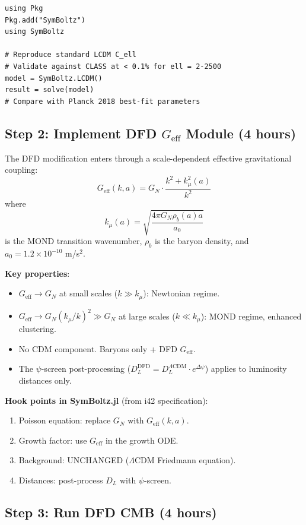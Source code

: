 \documentclass[11pt,a4paper]{article}
\begin{document}
\begin{verbatim}
using Pkg
Pkg.add("SymBoltz")
using SymBoltz

# Reproduce standard LCDM C_ell
# Validate against CLASS at < 0.1% for ell = 2-2500
model = SymBoltz.LCDM()
result = solve(model)
# Compare with Planck 2018 best-fit parameters
\end{verbatim}

\subsection{Step 2: Implement DFD $G_\text{eff}$ Module (4 hours)}

The DFD modification enters through a scale-dependent effective gravitational coupling:
\[
G_\text{eff}(k, a) = G_N \cdot \frac{k^2 + k_\mu^2(a)}{k^2}
\]
where
\[
k_\mu(a) = \sqrt{\frac{4\pi G_N \rho_b(a) a}{a_0}}
\]
is the MOND transition wavenumber, $\rho_b$ is the baryon density, and $a_0 = 1.2 \times 10^{-10}$ m/s$^2$.

\textbf{Key properties}:
\begin{itemize}
\item $G_\text{eff} \to G_N$ at small scales ($k \gg k_\mu$): Newtonian regime.
\item $G_\text{eff} \to G_N (k_\mu/k)^2 \gg G_N$ at large scales ($k \ll k_\mu$): MOND regime, enhanced clustering.
\item No CDM component. Baryons only + DFD $G_\text{eff}$.
\item The $\psi$-screen post-processing ($D_L^\text{DFD} = D_L^{\Lambda\text{CDM}} \cdot e^{\Delta\psi}$) applies to luminosity distances only.
\end{itemize}

\textbf{Hook points in SymBoltz.jl} (from i42 specification):
\begin{enumerate}
\item Poisson equation: replace $G_N$ with $G_\text{eff}(k, a)$.
\item Growth factor: use $G_\text{eff}$ in the growth ODE.
\item Background: UNCHANGED ($\Lambda$CDM Friedmann equation).
\item Distances: post-process $D_L$ with $\psi$-screen.
\end{enumerate}

\subsection{Step 3: Run DFD CMB (4 hours)}
\end{document}
